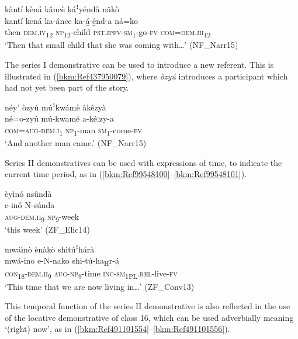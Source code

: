 \ea
\label{bkm:Ref450572179}
kàntí kèná kâncè káꜝyéndà nâkò\\
\gll kantí  kená    ka-ánce  ka-á̲-é̲nd-a    ná=ko\\
then  \textsc{dem}.\textsc{iv}\textsubscript{12}  \textsc{np}\textsubscript{12}-child  \textsc{pst}.\textsc{ipfv}-\textsc{sm}\textsubscript{1}-go-\textsc{fv}  \textsc{com}=\textsc{dem}.\textsc{iii}\textsubscript{12}\\
\glt ‘Then that small child that she was coming with…’ (NF\_Narr15)
\z

The series I demonstrative can be used to introduce a new referent. This is illustrated in (\ref{bkm:Ref437950079}), where \textit{òzyú} introduces a participant which had not yet been part of the story.

\ea
\label{bkm:Ref437950079}
néy’ òzyú múꜝkwámè àkêzyà\\
\gll né=o-zyú    mú-kwamé  a-ké̲ːzy-a\\
\textsc{com}=\textsc{aug}-\textsc{dem}.\textsc{i}\textsubscript{1}  \textsc{np}\textsubscript{1}-man  \textsc{sm}\textsubscript{1}-come-\textsc{fv}\\
\glt ‘And another man came.’ (NF\_Narr15)
\z

Series II demonstratives can be used with expressions of time, to indicate the current time period, as in (\ref{bkm:Ref99548100}--\ref{bkm:Ref99548101}).

\ea
\label{bkm:Ref99548100}
èyìnó nsûndà\\
\gll e-inó    N-súnda\\
\textsc{aug}-\textsc{dem}.\textsc{ii}\textsubscript{9}  \textsc{np}\textsubscript{9}-week\\
\glt ‘this week’ (ZF\_Elic14)
\z

\ea
\label{bkm:Ref99548101}
mwáìnò ènàkò shìtúꜝhárà\\
\gll mwá-ino    e-N-nako    shi-tú̲-ha\textsubscript{H}r-á̲\\
\textsc{con}\textsubscript{18}-\textsc{dem}.\textsc{ii}\textsubscript{9}  \textsc{aug}-\textsc{np}\textsubscript{9}-time  \textsc{inc}-\textsc{sm}\textsubscript{1PL}.\textsc{rel}-live-\textsc{fv}\\
\glt ‘This time that we are now living in…’ (ZF\_Conv13)
\z

This temporal function of the series II demonstrative is also reflected in the use of the locative demonstrative of class 16, which can be used adverbially meaning ‘(right) now’, as in (\ref{bkm:Ref491101554}--\ref{bkm:Ref491101556}).

